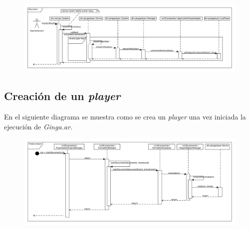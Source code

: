 \begin{figure}[ht!]
\centering
\includegraphics[scale=.4, angle=-90]{../resources/uml-sequence-diagram-keyPress2}
\end{figure}
\clearpage
 
\subsection{Creación de un \textit{player}}
En el siguiente diagrama se muestra como se crea un \textit{player} una vez iniciada la ejecución de \textit{Ginga.ar}. 

\begin{figure}[ht!]
\centering
\includegraphics[scale=.4, angle=-90]{../resources/uml-sequence-diagram-playerCreate}
\end{figure}

